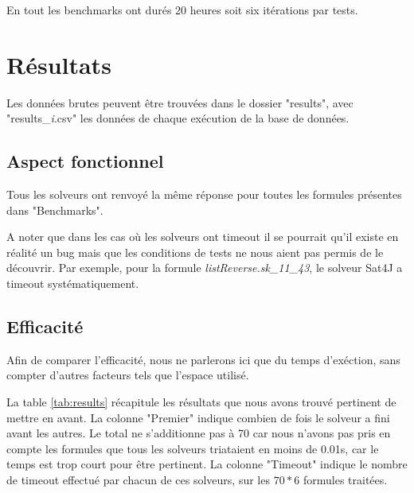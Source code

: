 \documentclass[11pt,a4paper]{article}
\begin{document}
En tout les benchmarks ont durés 20 heures soit six itérations par tests.


\section{Résultats}

Les données brutes peuvent être trouvées dans le dossier "results", avec "results\_\textit{i}.csv" les données de chaque exécution de la base de données.

\subsection{Aspect fonctionnel}

Tous les solveurs ont renvoyé la même réponse pour toutes les formules présentes dans "Benchmarks".

A noter que dans les cas où les solveurs ont timeout il se pourrait qu'il existe en réalité un bug mais que les conditions de tests ne nous aient pas permis de le découvrir. Par exemple, pour
la formule \textit{listReverse.sk\_11\_43}, le solveur Sat4J a timeout systématiquement.

\subsection{Efficacité}

Afin de comparer l'efficacité, nous ne parlerons ici que du temps d'exéction, sans compter d'autres facteurs tels que l'espace utilisé.

La table \ref{tab:results} récapitule les résultats que nous avons trouvé pertinent de mettre en avant. 
La colonne "Premier" indique combien de fois le solveur a fini avant les autres. Le total ne s'additionne pas à 70 car nous n'avons pas pris en compte les formules que tous les solveurs triataient en moins de 0.01s, car le temps est trop court pour être pertinent.
La colonne "Timeout" indique le nombre de timeout effectué par chacun de ces solveurs, sur les $70 * 6$ formules traitées. 
\end{document}
